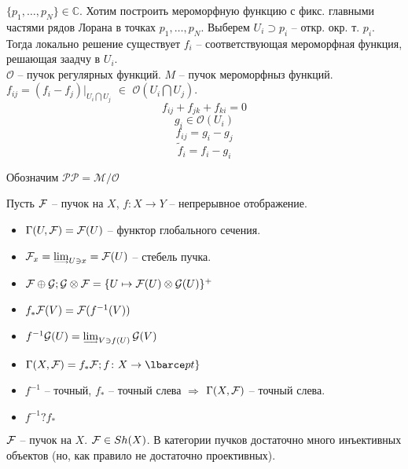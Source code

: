 \documentclass[../main.tex]{subfiles}
\begin{document}
\begin{to_suj}
$\lbrace p_1, \ldots, p_N\rbrace \in \mathbb{C}$. Хотим построить мероморфную функцию с фикс. главными частями рядов Лорана в точках $p_1, \ldots, p_N$. Выберем $U_i \supset p_i$ -- откр. окр. т. $p_i$. Тогда локально решение существует $f_i$ -- соответствующая мероморфная функция, решающая заадчу в $U_i$.\\
$\mathcal{O}$ -- пучок регулярных функций. $M$ -- пучок мероморфныз функций. $f_{ij} = (f_i - f_j)\vert_{U_i\bigcap U_j}$ $\in$ $\mathcal{O}(U_i\bigcap U_j)$.
\[ f_{ij} + f_{jk} + f_{ki} = 0\]
\[
g_i \in \mathcal{O}(U_i)
\]
\[f_{ij} = g_i - g_j\]
\[\tilde{f}_i = f_i - g_i\]
\end{to_suj}
Обозначим $\mathcal{PP} = \mathcal{M}/\mathcal{O}$
\bee
{}
\eee
Пусть $\mathcal{F}$ -- пучок на $X$, $f\colon X \to Y$ -- непрерывное отображение. 
\begin{itemize}
    \item $\Gamma (U, \mathcal{F})=\mathcal{F} (U)$ -- функтор глобального сечения.
    \item $\F_x = \varinjlim_{U \ni x}= \F(U)$ -- стебель пучка.
    \item $\mathcal{F} \oplus \mathcal{G};\mathcal{G} \otimes \mathcal{F} = \lbrace U \mapsto \mathcal{F}(U) \otimes \mathcal{G}(U)\rbrace^{+}$
    \item $f_*\mathcal{F}(V) = \mathcal{F}(f^{-1}(V))$
    \item $f^{-1}\G (U) = \varinjlim_{V\ni f(U)}\G(V)$
    \item $\Gamma(X, \F) = f_* \F ; f \colon X \to \lbarce pt \rbrace$
    \item $f^{-1}$ -- точный, $f_*$ -- точный слева $\Rightarrow$ $\Gamma(X, \mathcal{F})$ -- точный слева.
    \item  $f^{-1} ? f_*$
\end{itemize}
\bee
{}
\eee
\begin{to_claim}
$\mathcal{F}$ -- пучок на $X$. $\mathcal{F} \in Sh(X)$. В категории пучков достаточно много инъективных объектов (но, как правило не достаточно проективных).
\end{to_claim}
\end{document}
